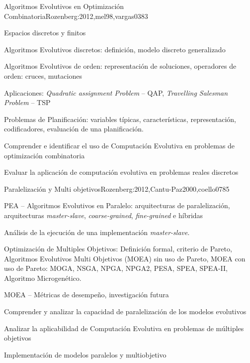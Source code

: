 \begin{syllabus}
\begin{unit}{Algoritmos Evolutivos en Optimización Combinatoria}{Rozenberg:2012,mel98,vargas03}{8}{3}
\begin{topics}
  \item Espacios discretos y finitos
	\item Algoritmos Evolutivos discretos: definición, modelo discreto generalizado
  \item Algoritmos Evolutivos de orden: representación de soluciones, operadores de orden: cruces, mutaciones
	\item Aplicaciones: \textit{Quadratic assignment Problem} -- QAP, \textit{Travelling Salesman Problem} -- TSP
	\item Problemas de Planificación: variables típicas, características, representación, codificadores, evaluación de una planificación. 
\end{topics}
\begin{unitgoals}
  \item Comprender e identificar el uso de Computación Evolutiva en problemas de optimización combinatoria
  \item Evaluar la aplicación de computación evolutiva en problemas reales discretos
\end{unitgoals}
\end{unit}

\begin{unit}{Paralelización y Multi objetivos}{Rozenberg:2012,Cantu-Paz2000,coello07}{8}{5}
\begin{topics}
  \item PEA -- Algoritmos Evolutivos en Paralelo: arquitecturas de paralelización, arquitecturas \textit{master-slave}, \textit{coarse-grained}, \textit{fine-grained} e híbridas 
  \item Análisis de la ejecución de una implementación \textit{master-slave}.
  \item Optimización de Multiples Objetivos: Definición formal, criterio de Pareto, Algoritmos Evolutivos Multi Objetivos (MOEA) sin uso de Pareto, MOEA con uso de Pareto: MOGA, NSGA, NPGA, NPGA2, PESA, SPEA, SPEA-II, Algoritmo Microgenético. 
	\item MOEA -- Métricas de desempeño, investigación futura
\end{topics}
\begin{unitgoals}
  \item Comprender y analizar la capacidad de paralelización de los modelos evolutivos
  \item Analizar la aplicabilidad de Computación Evolutiva en problemas de múltiples objetivos
  \item Implementación de modelos paralelos y multiobjetivo
\end{unitgoals}
\end{unit}


\end{syllabus}
